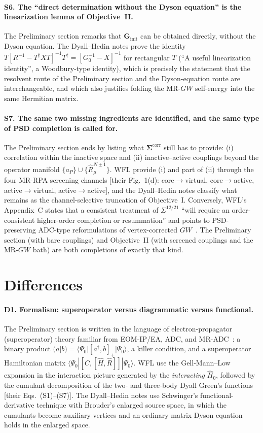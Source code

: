 \documentclass[11pt,a4paper]{article}
\newcommand{\bG}{\boldsymbol{G}}
\newcommand{\bSigma}{\boldsymbol{\Sigma}}
\newcommand{\braket}[1]{\langle#1\rangle}
\newcommand{\GW}{$GW$}
\newcommand{\MRGW}{MR-$GW$}
\newcommand{\WFL}{WFL}
\newcommand{\Pre}{Preliminary section}
\newcommand{\DHN}{Dyall--Hedin notes}
\begin{document}
\paragraph{S6. The ``direct determination without the Dyson equation'' is the
linearization lemma of Objective~II.}
The \Pre{} remarks that $\bG_{\text{init}}$ can be obtained directly, without
the Dyson equation.  The \DHN{} prove the identity
$T[R^{-1}-T^\dagger XT]^{-1}T^\dagger=[G_0^{-1}-X]^{-1}$ for rectangular $T$
(``A useful linearization identity'', a Woodbury-type identity), which is
precisely the statement that the resolvent route of the \Pre{} and the
Dyson-equation route are interchangeable, and which also justifies folding the
\MRGW{} self-energy into the same Hermitian matrix.

\paragraph{S7. The same two missing ingredients are identified, and the same
type of PSD completion is called for.}
The \Pre{} ends by listing what $\bSigma^{\text{corr}}$ still has to provide:
(i) correlation within the inactive space and (ii) inactive--active couplings
beyond the operator manifold $\{a_P\}\cup\{\hat R^{N\pm1}_\mu\}$.  \WFL{}
provide (i) and part of (ii) through the four MR-RPA screening channels
[their Fig.~1(d): core$\to$virtual, core$\to$active, active$\to$virtual,
active$\to$active], and the \DHN{} classify what remains as the channel-selective
truncation of Objective~I.  Conversely, \WFL{}'s Appendix~C states that a
consistent treatment of $\Sigma^{12/21}$ ``will require an order-consistent
higher-order completion or resummation'' and points to PSD-preserving ADC-type
reformulations of vertex-corrected \GW{}~\cite{MarieTolleLoos2026}.  The
\Pre{} (with bare couplings) and Objective~II (with screened couplings and the
\MRGW{} bath) are both completions of exactly that kind.

\section{Differences}
\label{sec:differences}

\paragraph{D1. Formalism: superoperator versus diagrammatic versus functional.}
The \Pre{} is written in the language of electron-propagator (superoperator)
theory familiar from EOM-IP/EA, ADC, and MR-ADC~\cite{GoscinskiLukman1970,Ortiz2013,Schirmer1983,Sokolov2018,ChatterjeeSokolov2019}:
a binary product $(a|b)=\braket{\Psi_0|[a^\dagger,b]_+|\Psi_0}$, a killer
condition, and a superoperator Hamiltonian matrix
$\braket{\Psi_0|[\hat C,[\hat H,\hat R]]|\Psi_0}$.  \WFL{} use the
Gell-Mann--Low expansion in the interaction picture generated by the
\emph{interacting} $\hat H_0$, followed by the cumulant decomposition of the
two- and three-body Dyall Green's functions [their Eqs.~(S1)--(S7)].  The
\DHN{} use Schwinger's functional-derivative technique with Brouder's
enlarged source space, in which the cumulants become auxiliary vertices and an
ordinary matrix Dyson equation holds in the enlarged space.
\end{document}
